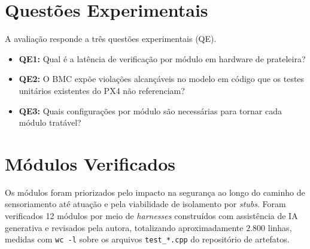 \section{Questões Experimentais}
\label{sec:objetivos-verificacao}

A avaliação responde a três questões experimentais (QE). 

\begin{itemize}
    \item \textbf{QE1:} Qual é a latência de verificação por módulo em hardware
    de prateleira? 
    \item \textbf{QE2:} O BMC expõe violações alcançáveis no modelo em código
    que os testes unitários existentes do PX4 não referenciam?
    \item \textbf{QE3:} Quais configurações por módulo são necessárias para
    tornar cada módulo tratável? 
\end{itemize}


\section{Módulos Verificados}
\label{sec:modulos-verificados}

Os módulos foram priorizados pelo impacto na segurança ao longo do caminho de
sensoriamento até atuação e pela viabilidade de isolamento por \textit{stubs}.
Foram verificados 12 módulos por meio de \textit{harnesses} construídos com assistência de IA generativa e revisados pela autora,
totalizando aproximadamente $2.800$ linhas, medidas com \texttt{wc -l} sobre os
arquivos \texttt{test\_*.cpp} do repositório de artefatos.

